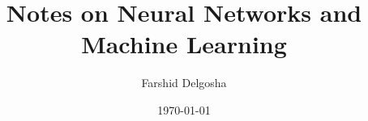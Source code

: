 \documentclass[11pt, openany]{book}
\begin{document}
\title{Notes on Neural Networks and Machine Learning}
\author{Farshid Delgosha}
\date{\today}

\maketitle
\tableofcontents





\appendix
\printglossary[type=\acronymtype, title=Abbreviations]
\end{document}
